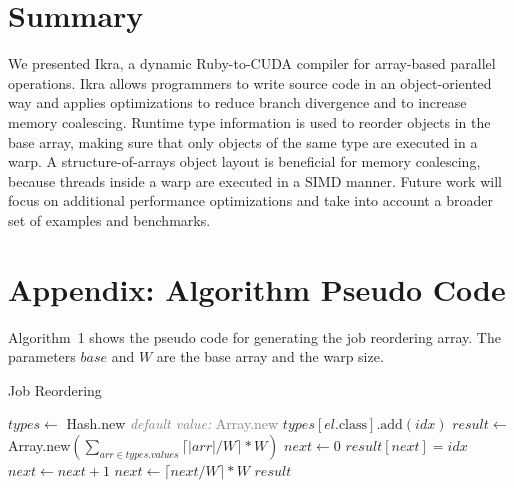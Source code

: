 \documentclass[preprint]{sigplanconf}
\begin{document}

\section{Summary}
We presented Ikra, a dynamic Ruby-to-CUDA compiler for array-based parallel operations. Ikra allows programmers to write source code in an object-oriented way and applies optimizations to reduce branch divergence and to increase memory coalescing. Runtime type information is used to reorder objects in the base array, making sure that only objects of the same type are executed in a warp. A structure-of-arrays object layout is beneficial for memory coalescing, because threads inside a warp are executed in a SIMD manner. Future work will focus on additional performance optimizations and take into account a broader set of examples and benchmarks.







\appendix
\section{Appendix: Algorithm Pseudo Code}
\label{sec:appendix_job_reorder}
\label{sec:appendix_obj_tracer}

Algorithm~1 shows the pseudo code for generating the job reordering array. The parameters $\mathit{base}$ and $W$ are the base array and the warp size.

\begin{algorithm}[!h]
\caption{Job Reordering}
\label{CHalgorithm}
\begin{algorithmic}[1]
\State $\mathit{types} \gets$ Hash.new \hfill \textcolor{gray}{\textit{default value:} Array.new}
    \State $\mathit{types}[\mathit{el}.\mbox{class}].\mbox{add}(\mathit{idx})$
\EndFor
\State $\mathit{result} \gets$ Array.new$(\sum_{\mathit{arr} \in \mathit{types}.\mathit{values}} \lceil |\mathit{arr}| / W \rceil * W)$
\State $\mathit{next} \gets 0$
        \State $\mathit{result}[\mathit{next}] = \mathit{idx}$
        \State $\mathit{next} \gets \mathit{next} + 1$
    \EndFor
    \State $\mathit{next} \gets \lceil \mathit{next} / W \rceil * W$
\EndFor
\State \Return $\mathit{result}$
\EndProcedure
\end{algorithmic}
\end{algorithm}
\end{document}

